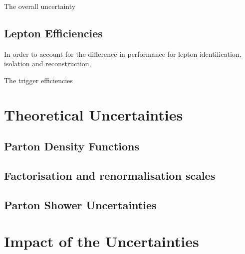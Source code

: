 The overall uncertainty \cite{CMS:2017_lumi} %
\subsection{Lepton Efficiencies}
In order to account for the difference in performance for lepton identification, isolation and reconstruction, 

The trigger efficiencies 
\section{Theoretical Uncertainties}
\subsection{Parton Density Functions}

\subsection{Factorisation and renormalisation scales}
\subsection{Parton Shower Uncertainties}
\section{Impact of the Uncertainties}

